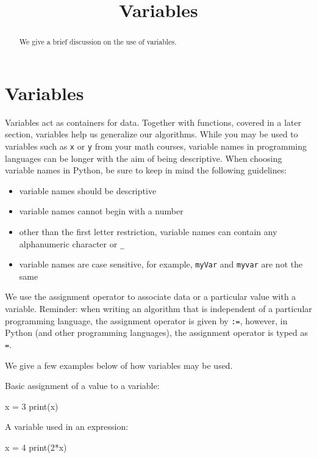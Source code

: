 \documentclass{ximera}
\title{Variables}
\begin{document}
  
\begin{abstract}  
We give a brief discussion on the use of variables.
\end{abstract}  
\maketitle

\section{Variables}

Variables act as containers for data. Together with functions, covered in a later section, variables help us generalize our algorithms. While you may be used to variables such as \verb|x| or \verb|y| from your math courses, variable names in programming languages can be longer with the aim of being descriptive. When choosing variable names in Python, be sure to keep in mind the following guidelines:

\begin{itemize}
	\item variable names should be descriptive
	\item variable names cannot begin with a number
	\item other than the first letter restriction, variable names can contain any alphanumeric character or \verb|_|
	\item variable names are case sensitive, for example, \verb|myVar| and \verb|myvar| are not the same
\end{itemize}

We use the assignment operator to associate data or a particular value with a variable. Reminder: when writing an algorithm that is independent of a particular programming language, the assignment operator is given by \verb|:=|, however, in Python (and other programming languages), the assignment operator is typed as \verb|=|.

We give a few examples below of how variables may be used.

Basic assignment of a value to a variable:

\begin{sageCell}
x = 3
print(x)
\end{sageCell}

A variable used in an expression:

\begin{sageCell}
x = 4
print(2*x)
\end{sageCell}
\end{document}
